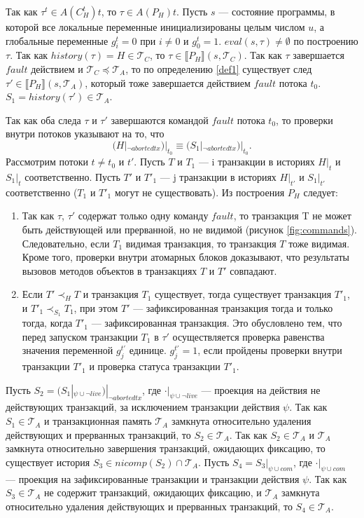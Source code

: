 \begin{myproof}
Так как $\tau^t \in A(C^t_H)t$, то $\tau \in A(P_H)t$. Пусть $s$ --- состояние программы, в которой все локальные переменные инициализированы целым числом $u$, а глобальные переменные $g^t_i = 0$ при $i \neq 0$ и $g^t_0 = 1$. $eval(s,\tau) \neq \emptyset$ по построению $\tau$. Так как $history(\tau) = H \in \mathcal{T}_C$, то $\tau \in \llbracket P_H \rrbracket(s,\mathcal{T}_C)$. Так как $\tau$ завершается $fault$ действием и $\mathcal{T}_C \preceq \mathcal{T}_A$, то по определению \ref{def1} %
существует след $\tau' \in \llbracket P_H \rrbracket(s,\mathcal{T}_A)$, который тоже завершается действием $fault$ потока $t_0$. $S_1 = history(\tau') \in \mathcal{T}_A$.

Так как оба следа $\tau$ и $\tau'$ завершаются командой $fault$ потока $t_0$, то проверки внутри потоков указывают на то, что \begin{equation} \label{eq:hist_fault}
(H|_{\neg abortedtx})|_{t_0} \equiv ({S_1}|_{\neg abortedtx})|_{t_0}. 
\end{equation}
Рассмотрим потоки $t \neq t_0$ и $t'$. Пусть $T$ и $T_1$ --- i транзакции в историях $H|_t$ и ${S_1}|_t$ соответственно. Пусть $T'$ и $T'_1$ --- j транзакции в историях $H|_{t'}$ и ${S_1}|_{t'}$ соответственно ($T_1$ и $T'_1$ могут не существовать). Из построения $P_H$ следует:
\begin{enumerate}
\item Так как $\tau$, $\tau'$ содержат только одну команду $fault$, то транзакция T не может быть действующей или прерванной, но не видимой (рисунок \ref{fig:commands}). Следовательно, если $T_1$ видимая транзакция, то транзакция $T$ тоже видимая. Кроме того, проверки внутри атомарных блоков доказывают, что результаты вызовов методов объектов в транзакциях $T$ и $T'$ совпадают.  
\item Если $T' \prec_H T$ и транзакция $T_1$ существует, тогда существует транзакция $T'_1$, и $T'_1 \prec_{S_1} T_1$, при этом $T'$ --- зафиксированная транзакция тогда и только тогда, когда $T'_1$ --- зафиксированная транзакция. Это обусловлено тем, что перед запуском транзакции $T_1$ в $\tau'$ осуществляется проверка равенства значения переменной $g^{t'}_j$ единице. $g^{t'}_j = 1$, если пройдены проверки внутри транзакции $T'_1$ и проверка статуса транзакции $T'_1$.   
\end{enumerate}

Пусть $S_2 = (S_1|_{\psi\cup{\neg live}})|_{\neg abortedtx}$, где $\cdot|_{\psi \cup {\neg live}}$ --- проекция на действия не действующих транзакций, за исключением транзакции действия $\psi$. Так как $S_1 \in \mathcal{T}_A$ и транзакционная память $\mathcal{T}_A$ замкнута относительно удаления действующих и прерванных транзакций, то $S_2 \in \mathcal{T}_A$. Так как $S_2 \in \mathcal{T}_A$ и $\mathcal{T}_A$ замкнута относительно завершения транзакций, ожидающих фиксацию, то существует история $S_3 \in nicomp(S_2) \cap \mathcal{T}_A$. Пусть $S_4 = S_3|_{\psi \cup com}$, где $\cdot|_{\psi \cup com}$ --- проекция на зафиксированные транзакции и транзакции действия $\psi$. Так как $S_3 \in \mathcal{T}_A$ не содержит транзакций, ожидающих фиксацию, и $\mathcal{T}_A$ замкнута относительно удаления действующих и прерванных транзакций, то $S_4 \in \mathcal{T}_A$.


\end{myproof}
